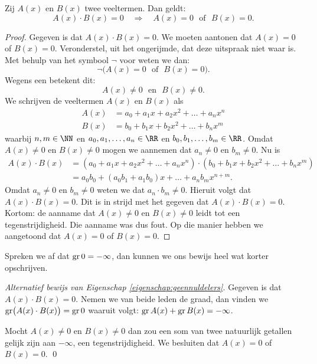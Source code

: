 \documentclass{ximera}
\begin{document}
\begin{eigenschap} \label{eigenschap:geennuldelers}
Zij $A(x)$ en $B(x)$ twee veeltermen. Dan geldt: 
\[
A(x)\cdot B(x) = 0 \quad \Rightarrow \quad A(x) = 0 \,\,\text{ of } \,\, B(x) = 0.
\]
\end{eigenschap}
\begin{proof}
Gegeven is dat $A(x)\cdot B(x) = 0$. We moeten aantonen dat $A(x) = 0$ of $B(x) = 0$. Veronderstel, uit het ongerijmde, dat deze uitspraak niet waar is. Met behulp van het symbool $\neg$ voor 
 weten we dan:
\[
\neg\bigl(A(x) = 0 \,\, \text{ of } \,\, B(x) = 0\bigr).
\]
Wegens een  betekent dit:
\[
A(x) \neq 0 \,\, \text{ en } \,\, B(x) \neq 0.
\] 
We schrijven de veeltermen $A(x)$ en $B(x)$ als
\begin{align*}
A(x) & = a_0 + a_1 x + a_2 x^2 + \dots + a_n x^n \\
B(x) & = b_0 + b_1 x + b_2 x^2 + \dots + b_n x^m
\end{align*}
waarbij $n,m \in \NN$ en $a_0, a_1, \ldots, a_n \in \RR$ en $b_0, b_1, \ldots, b_m \in \RR$. Omdat $A(x) \neq 0$ en $B(x) \neq 0$ mogen we aannemen dat $a_n \neq 0$ en $b_m \neq 0$. Nu is
\begin{align*}
A(x) \cdot B(x) 
& = \left(a_0 + a_1 x + a_2 x^2 + \dots + a_n x^n\right) \cdot \left( b_0 + b_1 x + b_2 x^2 + \dots + b_n x^m\right) \\
& = a_0b_0 + (a_0b_1 + a_1b_0)x + \dots + a_n b_m x^{n+m}.
\end{align*}
Omdat $a_n \neq 0$ en $b_m \neq 0$ weten we dat $a_n \cdot b_m \neq 0$. Hieruit volgt dat $A(x) \cdot B(x) = 0$. Dit is in strijd met het gegeven dat $A(x)\cdot B(x) = 0$. Kortom: de aanname dat $A(x) \neq 0$ en $B(x) \neq 0$ leidt tot een tegenstrijdigheid. Die aanname was dus fout. Op die manier hebben we aangetoond dat $A(x) = 0$ of $B(x) = 0$. 
\end{proof}

\begin{Uitbreiding}
Spreken we af dat $\operatorname{gr} 0 = - \infty$, dan kunnen we ons bewijs heel wat korter opschrijven. 

{\em Alternatief bewijs van Eigenschap \ref{eigenschap:geennuldelers}.}
Gegeven is dat $A(x)\cdot B(x) = 0$. Nemen we van beide leden de graad, dan vinden we $\operatorname{gr}\bigl( A(x)\cdot B(x) \bigr) = \operatorname{gr} 0$ waaruit volgt: $\operatorname{gr} A(x) + \operatorname{gr} B(x) = - \infty$.

Mocht $A(x) \neq 0$ en $B(x) \neq 0$ dan zou een som van twee natuurlijk getallen gelijk zijn aan $-\infty$, een tegenstrijdigheid. We besluiten dat $A(x) = 0$ of $B(x) = 0$.
\qed
\end{Uitbreiding}
\end{document}
